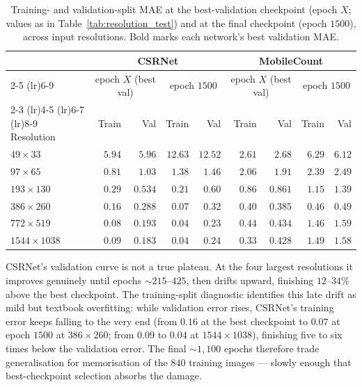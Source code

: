 \documentclass[conference]{IEEEtran}
\begin{document}
\begin{table}[t]
    \centering
    \caption{Training- and validation-split MAE at the
    best-validation checkpoint (epoch $X$; values as in
    Table~\ref{tab:resolution_test}) and at the final checkpoint
    (epoch $1500$), across input resolutions. Bold marks each
    network's best validation MAE.}
    \label{tab:last-checkpoint-mae}
    \small
    \begin{tabular}{l rr rr rr rr}
        \toprule
        & \multicolumn{4}{c}{CSRNet} & \multicolumn{4}{c}{MobileCount} \\
        \cmidrule(lr){2-5} \cmidrule(lr){6-9}
        & \multicolumn{2}{c}{epoch $X$ (best val)} & \multicolumn{2}{c}{epoch $1500$}
        & \multicolumn{2}{c}{epoch $X$ (best val)} & \multicolumn{2}{c}{epoch $1500$} \\
        \cmidrule(lr){2-3} \cmidrule(lr){4-5} \cmidrule(lr){6-7} \cmidrule(lr){8-9}
        Resolution & Train & Val & Train & Val & Train & Val & Train & Val \\
        \midrule
        $49\times33$     & $5.94$ & $5.96$  & $12.63$ & $12.52$ & $2.61$ & $2.68$  & $6.29$ & $6.12$ \\
        $97\times65$     & $0.81$ & $1.03$  & $1.38$  & $1.46$  & $2.06$ & $1.91$  & $2.39$ & $2.49$ \\
        $193\times130$   & $0.29$ & $0.534$ & $0.21$  & $0.60$  & $0.86$ & $0.861$ & $1.15$ & $1.39$ \\
        $386\times260$   & $0.16$ & $0.288$ & $0.07$  & $0.32$  & $0.40$ & $\mathbf{0.385}$ & $0.46$ & $0.49$ \\
        $772\times519$   & $0.08$ & $0.193$ & $0.04$  & $0.23$  & $0.44$ & $0.434$ & $1.46$ & $1.59$ \\
        $1544\times1038$ & $0.09$ & $\mathbf{0.183}$ & $0.04$  & $0.24$  & $0.33$ & $0.428$ & $1.49$ & $1.58$ \\
        \bottomrule
    \end{tabular}
\end{table}

CSRNet's validation curve is not a true plateau. At the four largest
resolutions it improves genuinely until epochs ${\sim}215$--$425$, then drifts
upward, finishing $12$--$34\%$ above the best checkpoint. The training-split
diagnostic identifies this late drift as mild but textbook overfitting: while
validation error rises, CSRNet's training error keeps falling to the very end
(from $0.16$ at the best checkpoint to $0.07$ at epoch $1500$ at
$386\times260$; from $0.09$ to $0.04$ at $1544\times1038$), finishing five to
six times below the validation error. The final ${\sim}1{,}100$ epochs
therefore trade generalisation for memorisation of the $840$ training
images — slowly enough that best-checkpoint selection absorbs the damage.
\end{document}
